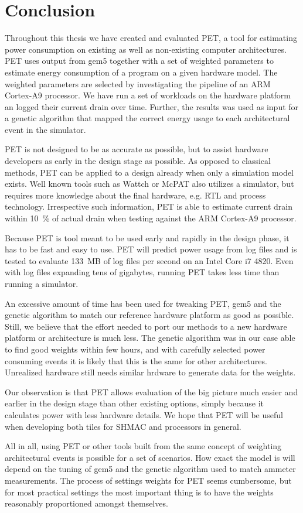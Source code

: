 \section{Conclusion}

Throughout this thesis we have created and evaluated PET, a tool for estimating
power consumption on existing as well as non-existing computer architectures.
PET uses output from gem5 together with a set of weighted parameters to estimate
energy consumption of a program on a given hardware model. The weighted
parameters are selected by investigating the pipeline of an ARM Cortex-A9
processor. We have run a set of workloads on the hardware platform an logged
their current drain over time. Further, the results was used as input for a
genetic algorithm that mapped the correct energy usage to each architectural
event in the simulator.

PET is not designed to be as accurate as possible, but to assist hardware
developers as early in the design stage as possible. As opposed to classical
methods, PET can be applied to a design already when only a simulation model
exists. Well known tools such as Wattch or McPAT also utilizes a simulator, but
requires more knowledge about the final hardware, e.g. RTL and process
technology. Irrespective such information, PET is able to estimate current drain
within 10~\% of actual drain when testing against the ARM Cortex-A9 processor.

Because PET is tool meant to be used early and rapidly in the design phase, it has
to be fast and easy to use. PET will predict power usage from log files and is
tested to evaluate 133~MB of log files per second on an Intel Core i7 4820. Even
with log files expanding tens of gigabytes, running PET takes less time than
running a simulator.

An excessive amount of time has been used for tweaking PET, gem5 and the genetic
algorithm to match our reference hardware platform as good as possible. Still,
we believe that the effort needed to port our methods to a new hardware platform
or architecture is much less. The genetic algorithm was in our case able to find
good weights within few hours, and with carefully selected power consuming
events it is likely that this is the same for other architectures. Unrealized
hardware still needs similar hrdware to generate data for the weights.

Our observation is that PET allows evaluation of the big picture much easier and
earlier in the design stage than other existing options, simply because it
calculates power with less hardware details. We hope that PET will be useful
when developing both tiles for SHMAC and processors in general.

All in all, using PET or other tools built from the same concept of weighting
architectural events is possible for a set of scenarios. How exact the model is
will depend on the tuning of gem5 and the genetic algorithm used to match
ammeter measurements. The process of settings weights for PET seems cumbersome,
but for most practical settings the most important thing is to have the weights
reasonably proportioned amongst themselves.
